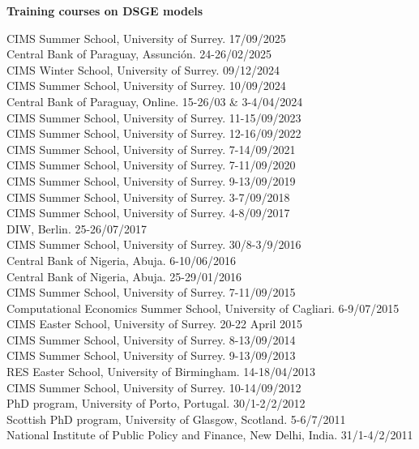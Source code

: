 \documentclass[margin, 11pt]{res} %
\begin{document}
\begin{resume}

\textbf{Training courses on DSGE models}

CIMS Summer School, University of Surrey. \hfill 17/09/2025 \\
Central Bank of Paraguay, Assunción. \hfill 24-26/02/2025 \\
CIMS Winter School, University of Surrey. \hfill 09/12/2024 \\
CIMS Summer School, University of Surrey. \hfill 10/09/2024 \\
Central Bank of Paraguay, Online. \hfill 15-26/03 \& 3-4/04/2024 \\
CIMS Summer School, University of Surrey. \hfill 11-15/09/2023 \\
CIMS Summer School, University of Surrey. \hfill 12-16/09/2022 \\
CIMS Summer School, University of Surrey. \hfill 7-14/09/2021 \\
CIMS Summer School, University of Surrey. \hfill 7-11/09/2020 \\
CIMS Summer School, University of Surrey. \hfill 9-13/09/2019 \\
CIMS Summer School, University of Surrey. \hfill 3-7/09/2018 \\
CIMS Summer School, University of Surrey. \hfill 4-8/09/2017\\
DIW, Berlin. \hfill 25-26/07/2017 \\
CIMS Summer School, University of Surrey. \hfill 30/8-3/9/2016\\
Central Bank of Nigeria, Abuja. \hfill 6-10/06/2016 \\
Central Bank of Nigeria, Abuja. \hfill 25-29/01/2016\\
CIMS Summer School, University of Surrey. \hfill 7-11/09/2015\\
Computational Economics Summer School, University of Cagliari. \hfill 6-9/07/2015\\
CIMS Easter School, University of Surrey. \hfill 20-22 April 2015\\
CIMS Summer School, University of Surrey. \hfill 8-13/09/2014\\
CIMS Summer School, University of Surrey. \hfill 9-13/09/2013\\
RES Easter School, University of Birmingham. \hfill 14-18/04/2013\\
CIMS Summer School, University of Surrey. \hfill 10-14/09/2012 \\
PhD program, University of Porto, Portugal. \hfill 30/1-2/2/2012\\
Scottish PhD program, University of Glasgow, Scotland. \hfill 5-6/7/2011\\
National Institute of Public Policy and Finance, New Delhi, India. \hfill 31/1-4/2/2011


\end{resume}
\end{document}
